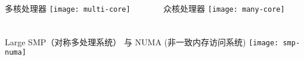 
\begin{frame}
	\begin{columns}
		\begin{column}{.5\textwidth}
			\Large
			多核处理器	
			\texttt{[image: multi-core]}
			
		\end{column}
		
		\begin{column}{.5\textwidth}
			\Large
			众核处理器
			\texttt{[image: many-core]}
			
		\end{column}
	\end{columns}
\end{frame}

\begin{frame}[plain]	
	\frametitle{}
	\centering
	Large 
	SMP（对称多处理系统） 与 NUMA (非一致内存访问系统)
	\texttt{[image: smp-numa]}
\end{frame}


